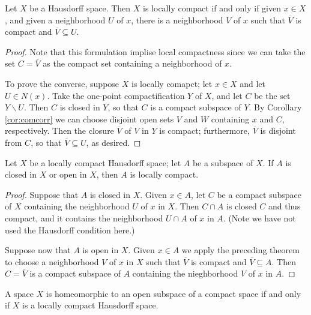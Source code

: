 \documentclass[12pt, a4paper, oneside, openright, titlepage]{book}
\begin{document}
\begin{theorem}
    Let $X$ be a Hausdorff space. Then $X$ is locally compact if and only if given $x \in X$, and given a neighborhood $U$ of $x$, there is a neighborhood $V$ of $x$ such that $\overline{V}$ is compact and $\overline{V} \subseteq U$.
\end{theorem}
\begin{proof}
    Note that this formulation implise local compactness since we can take the set $C = \overline{V}$ as the compact set containing a neighborhood of $x$.

    To prove the converse, suppose $X$ is locally comapct; let $x \in X$ and let $U \in N(x)$. Take the one-point compactification $Y$ of $X$, and let $C$ be the set $Y \backslash U$. Then $C$ is closed in $Y$, so that $C$ is a compact subspace of $Y$. By Corollary \ref{cor:comcorr} we can choose disjoint open sets $V$ and $W$ containing $x$ and $C$, respectively. Then the closure $\overline{V}$ of $V$ in $Y$ is compact; furthermore, $\overline{V}$ is disjoint from $C$, so that $\overline{V} \subseteq U$, as desired.
\end{proof}

\begin{corollary}
    Let $X$ be a locally compact Hausdorff space; let $A$ be a subspace of $X$. If $A$ is closed in $X$ or open in $X$, then $A$ is locally compact.
\end{corollary}
\begin{proof}
    Suppose that $A$ is closed in $X$. Given $x \in A$, let $C$ be a compact subspace of $X$ containing the neighborhood $U$ of $x$ in $X$. Then $C\cap A$ is closed $C$ and thus compact, and it contains the neighborhood $U\cap A$ of $x$ in $A$. (Note we have not used the Hausdorff condition here.)

    Suppose now that $A$ is open in $X$. Given $x \in A$ we apply the preceding theorem to choose a neighborhood $V$ of $x$ in $X$ such that $\overline{V}$ is compact and $\overline{V} \subseteq A$. Then $C = \overline{V}$ is a compact subspace of $A$ containing the nieghborhood $V$ of $x$ in $A$.
\end{proof}

\begin{corollary}
    A space $X$ is homeomorphic to an open subspace of a compact space if and only if $X$ is a locally compact Hausdorff space.
\end{corollary}
\end{document}
